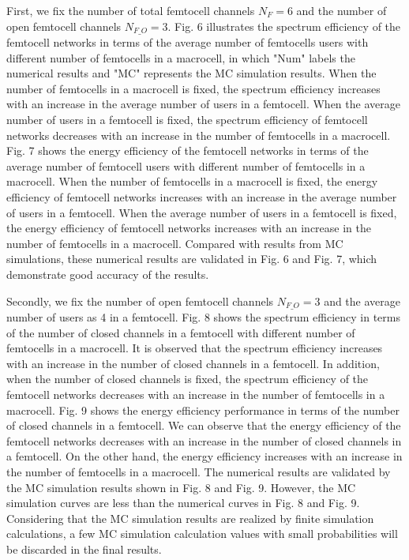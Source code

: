 \documentclass[10pt,final,journal,letterpaper,twoside,twocolumn]{IEEEtran}
\begin{document}
First, we fix the number of total femtocell channels ${N_F=6}$ and the number of open femtocell channels ${N_{F\_O}=3}$. Fig. 6 illustrates the spectrum efficiency of the femtocell networks in terms of the average number of femtocells users with different number of femtocells in a
macrocell, in which "Num" labels the numerical results and "MC" represents the MC simulation results. When the number of femtocells in a macrocell is fixed, the
spectrum efficiency increases with an increase in the average number of users in a femtocell. When the average number
of users in a femtocell is fixed, the spectrum efficiency of femtocell
networks decreases with an increase in the number of femtocells in a macrocell. Fig. 7 shows the
energy efficiency of the femtocell networks in terms of the average number of
femtocell users with different number of femtocells in a macrocell. When the
number of femtocells in a macrocell is fixed, the energy efficiency of
femtocell networks increases with an increase in the average number of users in a femtocell. When the average number
of users in a femtocell is fixed, the energy efficiency of femtocell networks
increases with an increase in the number of femtocells in a macrocell. Compared with results from MC simulations, these numerical results are validated in Fig. 6 and Fig. 7, which demonstrate good accuracy of the results.

Secondly, we fix the number of open femtocell channels ${N_{F\_O}=3}$ and the average number of users as 4 in a femtocell. Fig. 8 shows the spectrum efficiency in terms of the number of closed channels in a femtocell with different number of femtocells in a macrocell.
It is observed that the spectrum efficiency increases with an increase in the number of closed
channels in a femtocell. In addition, when the number of closed channels is fixed, the
spectrum efficiency of the femtocell networks decreases with an increase in the number of femtocells
in a macrocell. Fig. 9 shows the energy efficiency performance in terms of
the number of closed channels in a femtocell. We can observe that the energy
efficiency of the femtocell networks decreases with an increase in the number of closed channels in a
femtocell. On the other hand, the energy efficiency increases with an increase in the number of
femtocells in a macrocell. The numerical results are validated by the MC simulation results shown in Fig. 8 and Fig. 9. However, the MC simulation curves are less than the numerical curves in Fig. 8 and Fig. 9. Considering that the MC simulation results are realized by finite simulation calculations, a few MC simulation calculation values with small probabilities will be discarded in the final results.
\end{document}
